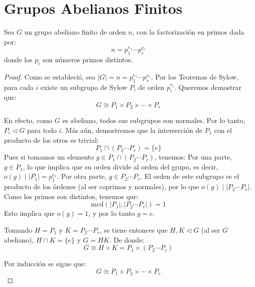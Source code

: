 \section{Grupos Abelianos Finitos}
\label{sec:Grupos Abelianos Finitos}

Sea $G$ un grupo abeliano finito de orden $n$, con la factorización en primos dada por:
\begin{equation*}
n = p_1^{e_1} \cdots p_r^{e_r}
\end{equation*}
donde los $p_i$ son números primos distintos.


\begin{proof}
Como se estableció, sea $|G| = n = p_1^{e_1} \cdots p_r^{e_r}$. Por los Teoremas de Sylow, para cada $i$ existe un subgrupo de Sylow $P_i$ de orden $p_i^{e_i}$.
Queremos demostrar que:
\begin{equation*}
G \cong P_1 \times P_2 \times \cdots \times P_r
\end{equation*}

En efecto, como $G$ es abeliano, todos sus subgrupos son normales. Por lo tanto, $P_i \triangleleft G$ para todo $i$.
Más aún, demostremos que la intersección de $P_1$ con el producto de los otros es trivial:
\begin{equation*}
P_1 \cap (P_2 \cdots P_r) = \{e\}
\end{equation*}
Pues si tomamos un elemento $g \in P_1 \cap (P_2 \cdots P_r)$, tenemos:
Por una parte, $g \in P_1$, lo que implica que su orden divide al orden del grupo, es decir, $o(g) \mid |P_1| = p_1^{e_1}$.
Por otra parte, $g \in P_2 \cdots P_r$. El orden de este subgrupo es el producto de los órdenes (al ser coprimos y normales), por lo que $o(g) \mid |P_2 \cdots P_r|$.
Como los primos son distintos, tenemos que:
\begin{equation*}
\text{mcd}(|P_1|, |P_2 \cdots P_r|) = 1
\end{equation*}
Esto implica que $o(g) = 1$, y por lo tanto $g = e$.

Tomando $H = P_1$ y $K = P_2 \cdots P_r$, se tiene entonces que $H, K \triangleleft G$ (al ser $G$ abeliano), $H \cap K = \{e\}$ y $G = HK$.
De donde:
\begin{equation*}
G \cong H \times K = P_1 \times (P_2 \cdots P_r)
\end{equation*}

Por inducción se sigue que:
\begin{equation*}
G \cong P_1 \times P_2 \times \cdots \times P_r
\end{equation*}
\end{proof}

